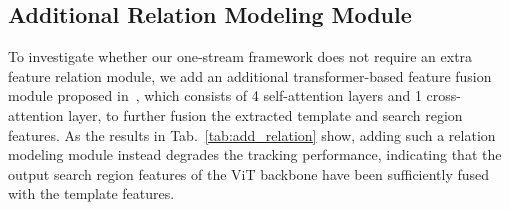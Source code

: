 \begin{table}[t]
\caption{The effect of adding additional identity embeddings to the template and search region embeddings and adding relative positional embeddings to the OSTrack-256 (without the early candidate elimination module). The results on LaSOT~\cite{lasot}, TrackingNet~\cite{trackingnet} and GOT10k~\cite{got10k} benchmarks are presented.}
\centering
\label{tab:rpe}
\end{table}

\subsection{Additional Relation Modeling Module}
To investigate whether our one-stream framework does not require an extra feature relation module, we add an additional transformer-based feature fusion module proposed in~\cite{swintrack}, which consists of 4 self-attention layers and 1 cross-attention layer, to further fusion the extracted template and search region features. As the results in Tab.~\ref{tab:add_relation} show, adding such a relation modeling module instead degrades the tracking performance, indicating that the output search region features of the ViT backbone have been sufficiently fused with the template features.

